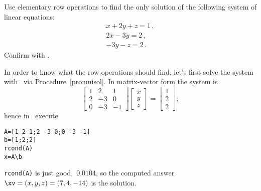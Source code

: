 \begin{example} \label{eg:erowops}
Use elementary row operations to find the only solution of the following system of linear equations:
\begin{equation*}
\begin{array}{l}
x+2y+z=1\,,\\ 2x-3y=2\,,\\ -3y-z=2\,.
\end{array}
\end{equation*}
Confirm with \script.
\begin{solution} 
In order to know what the row operations should find, let's first solve the system with \script\ via Procedure~\ref{pro:unisol}. 
In matrix-vector form the system is
\begin{equation*}
\begin{bmatrix} 1&2&1\\2&-3&0\\0&-3&-1 \end{bmatrix}
\begin{bmatrix} x\\y\\z \end{bmatrix}
=\begin{bmatrix} 1\\2\\2 \end{bmatrix};
\end{equation*}
hence in \script\ execute
\begin{verbatim}
A=[1 2 1;2 -3 0;0 -3 -1]
b=[1;2;2]
rcond(A)
x=A\b
\end{verbatim}
\setbox\ajrqrbox\hbox{}%
\marginpar{\usebox{\ajrqrbox\\[2ex]}}%
\verb|rcond(A)| is just good,~\(0.0104\), so the computed answer \(\xv=(x,y,z)=(7,4,-14)\) is the solution.


\end{solution}
\end{example}
